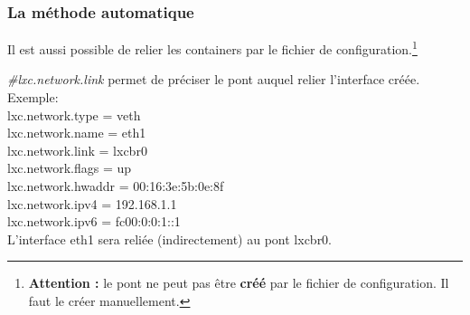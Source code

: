 \documentclass{article}
\begin{document}
\subsubsection{La m\'ethode automatique}

Il est aussi possible de relier les containers par le fichier de configuration.\footnote{\textbf{Attention : }le pont ne peut pas \^etre \textbf{cr\'e\'e} par le fichier de configuration. Il faut le cr\'eer manuellement.}

\noindent
\emph{\#lxc.network.link} permet de pr\'eciser le pont auquel relier l'interface cr\'e\'ee.\\

Exemple:\\
\noindent
lxc.network.type = veth\\
lxc.network.name = eth1\\
lxc.network.link = lxcbr0\\
lxc.network.flags = up\\
lxc.network.hwaddr = 00:16:3e:5b:0e:8f\\
lxc.network.ipv4 = 192.168.1.1\\
lxc.network.ipv6 = fc00:0:0:1::1\\

\noindent
L'interface eth1 sera reli\'ee (indirectement) au pont lxcbr0.
\end{document}
